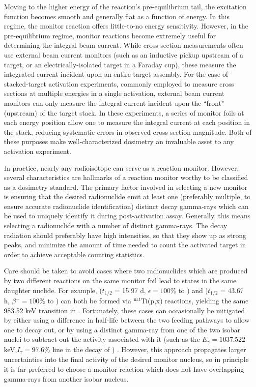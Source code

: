 \documentclass[3p]{elsarticle}
\begin{document}
Moving to the higher energy  of the reaction's pre-equilibrium tail, the excitation function becomes  smooth and generally flat as a function of energy.
In this regime, the monitor reaction offers little-to-no energy sensitivity. 
However,  in the pre-equilibrium regime, monitor reactions become extremely useful for determining the integral beam current. 
While cross section measurements often use external beam current monitors (such as an inductive pickup upstream of a target, or an electrically-isolated target in a Faraday cup), these measure the integrated current incident upon an entire target assembly.
For the case of stacked-target activation experiments, commonly employed to measure cross sections at multiple energies  in a single activation, external beam current monitors can only measure the integral current incident upon the \enquote{front} (upstream) of the target stack.
In these experiments, a series of monitor foils at each energy position allow one to measure the integral current at each position in the stack, reducing systematic errors in observed cross section magnitude.
Both of these purposes make well-characterized dosimetry an invaluable asset to any activation experiment. 



In practice, nearly any radioisotope can serve as a reaction monitor. 
However, several characteristics are hallmarks of a reaction monitor worthy to be classified as a dosimetry standard.
The primary factor involved in selecting a new monitor is ensuring that the desired radionuclide emit  at least one (preferably multiple, to ensure accurate radionuclide identification) distinct decay gamma-rays which can be used to uniquely identify it during post-activation assay.  
Generally, this means selecting a radionuclide with a number of distinct gamma-rays.
The decay radiation should preferably have high intensities, so that they show up as strong peaks, and minimize the amount of time needed to count the activated target in order to achieve acceptable counting statistics. 

Care should be taken to avoid cases where two radionuclides which are produced by two different reactions on the same monitor foil lead to states in the same daughter nuclide.  
For example,   ($t_{1/2}$ = 15.97 d, $\epsilon=100\%$ to ) and   ($t_{1/2}$ = 43.67 h, $\beta^-=100\%$ to ) can both be formed via $^\text{nat}$Ti(p,x) reactions, yielding the same 983.52 keV transition in  \cite{Burrows2006}.
Fortunately, these cases can occasionally be mitigated by either using a difference in half-life between the two feeding pathways to allow one to decay out, or by using a distinct gamma-ray from one of the two isobar nuclei to subtract out the activity associated with it (such as the $E_\gamma=1037.522$ keV,$I_\gamma=97.6\%$ line in the decay of ) \cite{Burrows2006}.
However, this approach propagates larger uncertainties into the final activity of the desired monitor nucleus, so in principle it is far preferred to choose a monitor reaction which does not have overlapping gamma-rays from another isobar nucleus.
\end{document}
